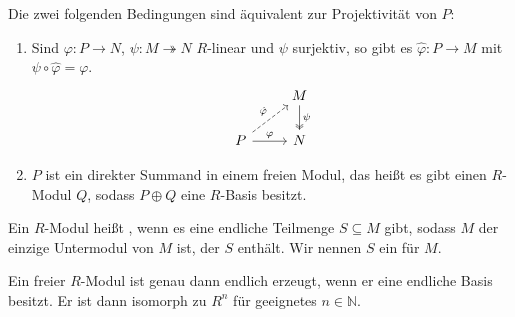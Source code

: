 \begin{bemerkung}[{name=[{Äquivalenzen zu Projektivität}]}]
	Die zwei folgenden Bedingungen sind äquivalent zur Projektivität von $P$:
	\begin{enumerate}[1)]
		\item Sind $\varphi \colon P \to N$, $\psi \colon M \twoheadrightarrow N$ $R$-linear und $\psi$ surjektiv, so gibt es $\hat{\varphi} \colon P \to M$ mit $\psi \circ \hat{\varphi} = \varphi$.
		\[
			\begin{tikzcd}
				& M \dar[two heads,"\psi"] \\
				P \rar["\varphi"] \urar["\hat{\varphi}",dashed] & N
			\end{tikzcd}
		\]
		\item $P$ ist ein direkter Summand in einem freien Modul, das heißt es gibt einen $R$-Modul $Q$, sodass $P \oplus Q$ eine $R$-Basis besitzt.
	\end{enumerate}
\end{bemerkung}

\begin{definition}[{name=[{endlich erzeugter $R$-Modul}]}]
	Ein $R$-Modul heißt , wenn es eine endliche Teilmenge $S \subseteq M$ gibt, sodass $M$ der einzige Untermodul von $M$ ist, der $S$ enthält.
	Wir nennen $S$ ein  für $M$.
\end{definition}

\begin{bemerkung}[{name=[{endlich erzeugte freie Moduln}]}]
	Ein freier $R$-Modul ist genau dann endlich erzeugt, wenn er eine endliche Basis besitzt.
	Er ist dann isomorph zu $R^n$ für geeignetes $n \in \mathbb{N}$.
\end{bemerkung}


